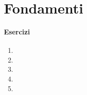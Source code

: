 \chapter{Fondamenti}
\subsubsection*{Esercizi}
\begin{enumerate}
    \item 
    \item 
    \item 
    \item 
    \item 
\end{enumerate}